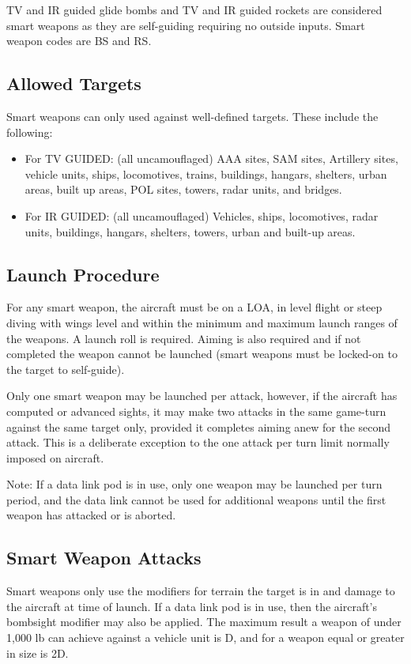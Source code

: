 
\label{rule:smart-weapons}

TV and IR guided glide bombs and TV and IR guided rockets are considered smart weapons as they are self-guiding requiring no outside inputs. Smart weapon codes are BS and RS.

\subsection{Allowed Targets} Smart weapons can only used against well-defined targets. These include the following:

\begin{itemize}
    \item For TV GUIDED: (all uncamouflaged) AAA sites, SAM sites, Artillery sites, vehicle units, ships, locomotives, trains, buildings, hangars, shelters, urban areas, built up areas, POL sites, towers, radar units, and bridges.

    \item For IR GUIDED: (all uncamouflaged) Vehicles, ships, locomotives, radar units, buildings, hangars, shelters, towers, urban and built-up areas.
\end{itemize}

\subsection{Launch Procedure} For any smart weapon, the aircraft must be on a LOA, in level flight or steep diving with wings level and within the minimum and maximum launch ranges of the weapons. A launch roll is required. Aiming is also required and if not completed the weapon cannot be launched (smart weapons must be locked-on to the target to self-guide).

Only one smart weapon may be launched per attack, however, if the aircraft has computed or advanced sights, it may make two attacks in the same game-turn against the same target only, provided it completes aiming anew for the second attack. This is a deliberate exception to the one attack per turn limit normally imposed on aircraft.

Note: If a data link pod is in use, only one weapon may be launched per turn period, and the data link cannot be used for additional weapons until the first weapon has attacked or is aborted.

\subsection{Smart Weapon Attacks} Smart weapons only use the modifiers for terrain the target is in and damage to the aircraft at time of launch. If a data link pod is in use, then the aircraft's bombsight modifier may also be applied. The maximum result a weapon of under 1,000 lb can achieve against a vehicle unit is D, and for a weapon equal or greater in size is 2D.

